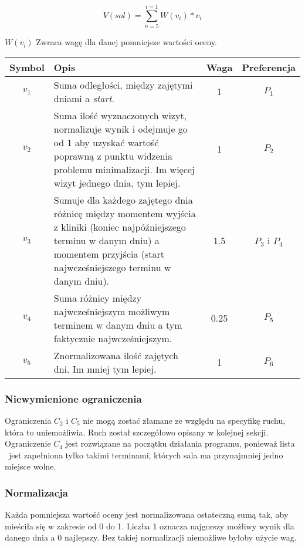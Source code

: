 \begin{equation}
	V(sol) = \sum_{n=5}^{i=1} W(v_i) * v_i
\end{equation}

$W(v_i)$  Zwraca wagę dla danej pomniejsze wartości oceny.
\begin{table}[h]
	\begin{tabularx}{\textwidth}{ | C{0.4} | L{2.6} | C{0.3} | C{0.7} | }
		\hline
		\bfseries Symbol & \bfseries Opis & \bfseries Waga & \bfseries
		Preferencja \\
		\hline
		$v_1$ & Suma odległości, między zajętymi dniami a \emph{start}.&
		1 & $P_1$\\
		\hline
		$v_2$ & Suma ilość wyznaczonych
		wizyt, normalizuje wynik i odejmuje go od 1 aby uzyskać wartość
		poprawną z punktu widzenia problemu minimalizacji. Im więcej
		wizyt jednego dnia, tym lepiej. & 1 &
		$P_2$\\
		\hline
		$v_3$ & Sumuje dla każdego zajętego dnia różnicę między momentem wyjścia z
		kliniki (koniec najpóźniejszego terminu w danym dniu) a momentem
		przyjścia (start najwcześniejszego terminu w danym
		dniu). & 1.5 & $P_3$ i $P_4$ \\
		\hline
		$v_4$ & Suma różnicy między
		najwcześniejszym możliwym terminem w danym dniu a tym faktycznie
		najwcześniejszym. & 0.25 & $P_5$\\
		\hline
		$v_5$ & Znormalizowana ilość zajętych dni. Im mniej tym lepiej. & 1 & $P_6$\\
		\hline
\end{tabularx}
\end{table}


\subsubsection{Niewymienione ograniczenia}
Ograniczenia $C_2$ i $C_5$ nie mogą zostać złamane ze względu na specyfikę
ruchu, która to uniemożliwia. Ruch został szczegółowo opisany w kolejnej sekcji.
Ograniczenie $C_4$ jest rozwiązane na początku działania programu, ponieważ
lista \sTermsList\ jest zapełniona tylko takimi terminami, których sala ma
przynajmniej jedno miejsce wolne.

\subsubsection{Normalizacja} 
Każda pomniejsza wartość oceny jest normalizowana ostateczną sumą tak, aby mieściła się w
zakresie od 0 do 1. Liczba 1 oznacza najgorszy możliwy wynik dla
danego dnia a 0 najlepszy. Bez takiej normalizacji niemożliwe byłoby użycie wag.

